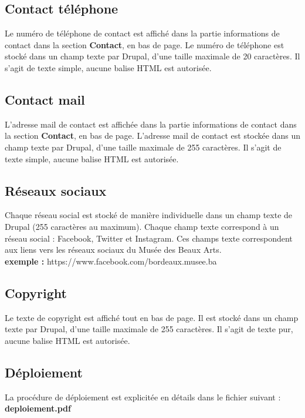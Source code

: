 \documentclass[11pt]{report}
\begin{document}
\subsection{Contact téléphone}

Le numéro de téléphone de contact est affiché dans la partie informations de
contact dans la section \textbf{Contact}, en bas de page.
Le numéro de téléphone est stocké dans un champ texte par Drupal, d'une taille
maximale de 20 caractères. Il s'agit de texte simple, aucune balise HTML est autorisée.

\subsection{Contact mail}

L'adresse mail de contact est affichée dans la partie informations de
contact dans la section \textbf{Contact}, en bas de page.
L'adresse mail de contact est stockée dans un champ texte par Drupal, d'une taille
maximale de 255 caractères. Il s'agit de texte simple, aucune balise HTML est autorisée.

\subsection{Réseaux sociaux}

Chaque réseau social est stocké de manière individuelle dans un champ texte de
Drupal (255 caractères au maximum). Chaque champ texte correspond à un réseau
social : Facebook, Twitter et Instagram. Ces champs texte correspondent aux liens
vers les réseaux sociaux du Musée des Beaux Arts. \\
\textbf{exemple : } https://www.facebook.com/bordeaux.musee.ba

\subsection{Copyright}

Le texte de copyright est affiché tout en bas de page.
Il est stocké dans un champ texte par Drupal, d'une taille maximale de 255
caractères. Il s'agit de texte pur, aucune balise HTML est autorisée.


\subsection*{Déploiement}
La procédure de déploiement est explicitée en détails dans le fichier
suivant : \textbf{deploiement.pdf}
\end{document}
